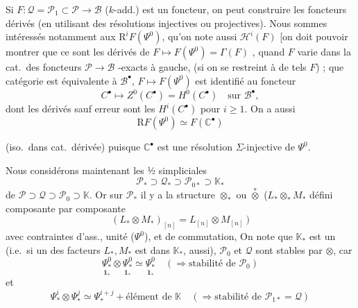 \documentclass[11pt,a4paper]{article}
\begin{document}
Si $F : \mathcal{Q} = \mathcal{P}_1 \subset \mathcal{P} \longrightarrow
\mathcal{B}$ ($k$-add.) est un foncteur, on peut construire les foncteurs
dérivés  (en utilisant des résolutions injectives ou
projectives). Nous sommes intéressés notamment aux
$\mathrm{R}^{i}F(\Psi^0)$, qu'on note aussi $\mathcal{H}^{i}(F)$ [on doit
pouvoir montrer que ce sont les dérivés  de
$F \mapsto F(\Psi^0) = \Gamma(F)$ , quand $F$
varie dans la cat.\ des foncteurs 
$\mathcal{P} \to \mathcal{B}$ \add{$\Sigma$}-exacts à gauche, (si on se
restreint à de tels $F$) ; que  catégorie est équivalente
à \struck{\ill{}} $\mathcal{B}^{\bullet}$, $F \mapsto F(\Psi^0)$ est
identifié au foncteur
\[
C^{\bullet} \longmapsto Z^{0}(C^{\bullet}) = H^{0}(C^{\bullet})
\quad \text{sur } \mathcal{B}^{\bullet},
\]
dont les dérivés sauf erreur sont les $H^{i}(C^{\bullet})$ pour
$i \geq 1$. On a aussi
\[
\mathrm{R}F(\Psi^0) \simeq F(\mathbb{C}^{\bullet})
\]

(iso.\ dans cat.\ dérivée) puisque $\mathbb{C}^{\bullet}$ est une résolution
$\Sigma$-injective de $\Psi^0$.

Nous considérons maintenant les  ½ simpliciales
\[
\mathcal{P}_{*} \supset \mathcal{Q}_{*} \supset \mathcal{P}_{0*} \supset
\mathbb{K}_{*}
\]
de $\mathcal{P} \supset \mathcal{Q} \supset \mathcal{P}_0 \supset
\mathbb{K}$. Or sur $\mathcal{P}_{*}$ il y a la structure $\otimes_{*}$ ou
$\overset{*}{\otimes}$ ($L_{*} \otimes_{*} M_{*}$ défini composante par
composante
\[
(L_{*} \otimes M_{*})_{[n]} = L_{[n]} \otimes M_{[n]} \ )
\]
avec contraintes d'ass., unité ($\Psi^0$), et de commutation,
 On note que $\mathbb{K}_{*}$ est un
 (i.e.\ si un des facteurs $L_{*}, M_{*}$ est dans
$\mathbb{K}_{*}$,  aussi), $\mathcal{P}_0$ et
$\mathcal{Q}$ sont stables par $\otimes$, car
\[
\underset{\mathbf{1}_{*}}{\Psi^{0}_{*}} \otimes
\underset{\mathbf{1}_{*}}{\Psi^{0}_{*}} \simeq
\underset{\mathbf{1}_{*}}{\Psi^{0}_{*}}
\quad (\Rightarrow \text{stabilité de } \mathcal{P}_0)
\]
et
\[
\Psi^{i}_{*} \otimes \Psi^{j}_{*} \simeq \Psi^{i+j}_{*} +
\text{élément de } \mathbb{K}
\quad (\Rightarrow \text{stabilité de } \mathcal{P}_{1*} = \mathcal{Q})
\]
\end{document}

